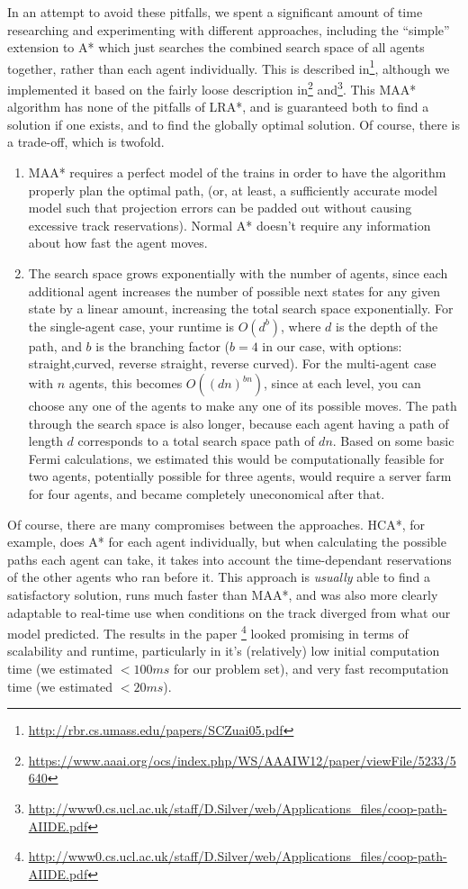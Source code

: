 \documentclass{article}
\begin{document}
In an attempt to avoid these pitfalls, we spent a significant amount of time
researching and experimenting with different approaches, including the ``simple''
extension to A* which just searches the combined search space of all agents
together, rather than each agent individually. This is described
in\footnote{\url{http://rbr.cs.umass.edu/papers/SCZuai05.pdf}}, although we
implemented it based on the fairly loose description
in\footnote{\url{https://www.aaai.org/ocs/index.php/WS/AAAIW12/paper/viewFile/5233/5640}}
and\footnote{\url{http://www0.cs.ucl.ac.uk/staff/D.Silver/web/Applications_files/coop-path-AIIDE.pdf}}.
This MAA* algorithm has none of the pitfalls of LRA*, and is
guaranteed both to find a solution if one exists, and to find the globally
optimal solution. Of course, there is a trade-off, which is twofold.
\begin{enumerate}
\item MAA* requires a perfect model of the trains in order to have the algorithm
	properly plan the optimal path, (or, at least, a sufficiently accurate model model
	such that projection errors can be padded out without causing excessive track reservations).
    Normal A* doesn't require any information about how fast the agent moves.
\item The search space grows exponentially with the number of agents, since
	each additional agent increases the number of possible next states for
	any given state by a linear amount, increasing the total search space
	exponentially. For the single-agent case, your runtime is $O(d^b)$,
	where $d$ is the depth of the path, and $b$ is the branching factor
	($b=4$ in our case, with options: straight,curved, reverse straight,
	reverse curved). For the multi-agent case with $n$ agents, this becomes
	$O((dn)^{bn})$,
	since at each level, you can choose any one of the agents to make any one
	of its possible moves. The path through the search space is also longer,
	because each agent having a path of length $d$ corresponds to a total search
	space path of $dn$. Based on some basic Fermi calculations, we estimated
	this would be computationally feasible for two agents, potentially possible
	for three agents, would require a server farm for four agents, and became
	completely uneconomical after that.
\end{enumerate}

Of course, there are many compromises between the approaches. HCA*, for
example, does A* for each agent individually, but when calculating the possible
paths each agent can take, it takes into account the time-dependant reservations
of the other agents who ran before it. This approach is \emph{usually} able to
find a satisfactory solution, runs much faster than MAA*, and was also more
clearly adaptable to real-time use when conditions on the track diverged from
what our model predicted. The results in the paper
\footnote{\url{http://www0.cs.ucl.ac.uk/staff/D.Silver/web/Applications_files/coop-path-AIIDE.pdf}}
looked promising in terms of scalability and runtime, particularly in it's
(relatively) low initial computation time (we estimated $<100ms$ for our problem
set), and very fast recomputation time (we estimated $<20ms$).
\end{document}
